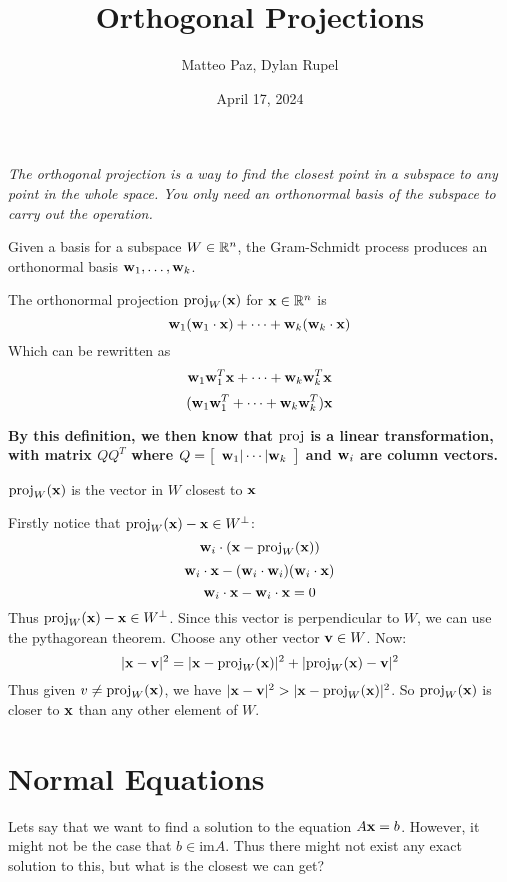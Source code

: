 \documentclass{article}
\author{Matteo Paz, Dylan Rupel}
\date{April 17, 2024}
\title{Orthogonal Projections}
\newcommand{\pj}{\text{\normalfont proj}}
\begin{document}
    \maketitle{}
    \noindent

    \emph{The orthogonal projection is a way to find the closest point in a subspace to any point in the whole space. You only need an orthonormal basis of the subspace to carry out the operation.} \vspace{1.5em}

    Given a basis for a subspace $W \in \mathbb{R}^n$, the Gram-Schmidt process produces an orthonormal basis $\mathbf{w}_1, \ldots, \mathbf{w}_k$.

    \begin{definition}
        The orthonormal projection $\pj_W(\bfx)$ for $\mathbf{x} \in \mathbb{R}^n$ is
        \[\mathbf{w}_1(\mathbf{w}_1 \cdot \mathbf{x}) + \cdots + \mathbf{w}_k(\mathbf{w}_k \cdot \mathbf{x})\]
        Which can be rewritten as
        \[\mathbf{w}_1\mathbf{w}_1^T \mathbf{x} + \cdots + \mathbf{w}_k\mathbf{w}_k^T\mathbf{x}\]
        \[(\mathbf{w}_1\mathbf{w}_1^T + \cdots + \mathbf{w}_k\mathbf{w}_k^T)\mathbf{x}\]
    \end{definition}

\textbf{By this definition, we then know that $\pj$ is a linear transformation, with matrix $QQ^T$ where $Q = \left[\begin{array}{c}\mathbf{w}_1 | \cdots | \mathbf{w}_k\end{array}\right]$ and $\mathbf{w}_i$ are column vectors.}

\begin{proposition}
    $\pj_W(\bfx)$ is the vector in $W$ closest to $\mathbf{x}$
\end{proposition}
\pf Firstly notice that $\pj_W(\bfx) - \bfx \in W^\perp$:
\[\bfw_i \cdot (\bfx - \pj_W(\bfx))\]
\[\mathbf{w}_i \cdot \mathbf{x} - (\mathbf{w}_i \cdot \mathbf{w}_i)(\mathbf{w}_i \cdot \mathbf{x})\]
\[\mathbf{w}_i \cdot \mathbf{x} - \mathbf{w}_i \cdot \mathbf{x} = 0\]
Thus $\pj_W(\bfx) - \bfx \in W^\perp$.
Since this vector is perpendicular to $W$, we can use the pythagorean theorem. Choose any other vector $\mathbf{v} \in W$. Now:
\[|\bfx - \bfv|^2 = |\bfx - \pj_W(\bfx)|^2 + |\pj_W(\bfx) - \bfv|^2\]
Thus given $v \not = \pj_W(\bfx)$, we have $|\bfx-\bfv|^2 > |\bfx - \pj_W(\bfx)|^2$. So $\pj_W(\bfx)$ is closer to $\mathbf{x}$ than any other element of $W$.

\section*{Normal Equations}

Lets say that we want to find a solution to the equation $A\mathbf{x} = b$. However, it might not be the case that $b \in \text{im} A$. Thus there might not exist any exact solution to this, but what is the closest we can get? \\
\end{document}
